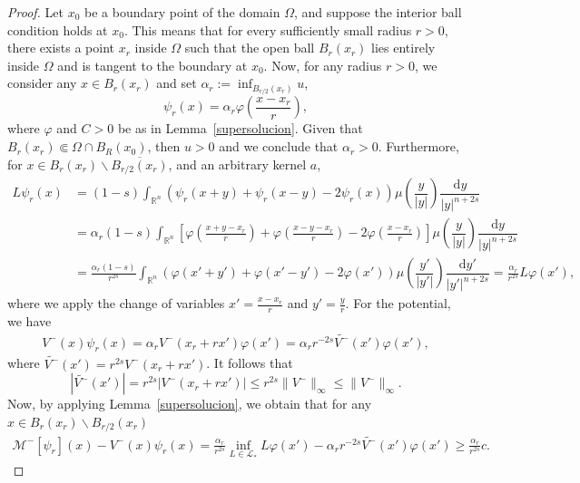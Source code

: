 \documentclass[11pt]{article}
\begin{document}
\begin{proof}
Let \(x_0\) be a boundary point of the domain \(\Omega\), and suppose the interior ball condition holds at \(x_0\). This means that for every sufficiently small radius \(r>0\), there exists a point \(x_r\) inside \(\Omega\) such that the open ball \(B_{r}(x_r)\) lies entirely inside \(\Omega\) and is tangent to the boundary at \(x_0\). Now, for any radius \(r>0\), we consider any \(x\in B_{r}(x_r)\) and set \(\alpha_r:=\inf_{B_{r/2}(x_r)}u\), 
\begin{equation*}
    \psi_{r}(x)=\alpha_{r}\varphi\left(\frac{x-x_{r}}{r}\right),
\end{equation*}
where \(\varphi\) and \(C>0\) be as in Lemma~\ref{supersolucion}. Given that \(B_{r}(x_r)\Subset\Omega \cap B_{R}(x_0)\), then \(u > 0\) and we conclude that \(\alpha_{r}>0\). Furthermore, for \(x\in B_{r}(x_r)\backslash \overline{B_{r/2}(x_r)}\), and an arbitrary kernel \(a\),
\begin{align*}
    L\psi_r(x) &= (1-s)\int_{\mathbb{R}^{n}}
    ({\psi_{r}(x+y) + \psi_{r}(x-y)}-2\psi_{r}(x))\mu \left(\dfrac{y}{|y|}\right)\dfrac{\mathrm{d}y}{|y|^{n+2s}} \\
    &=\alpha_{r}(1-s)\int_{\mathbb{R}^{n}}
    \left[ {\varphi(\frac{x+y-x_{r}}{r}) + \varphi(\frac{x-y-x_{r}}{r})}-2\varphi\left(\frac{x-x_r}{r}\right) \right]
    \mu\left(\dfrac{y}{|y|}\right)\dfrac{\mathrm{d}y}{|y|^{n+2s}} \\ 
    &= \frac{\alpha_{r}(1-s)}{r^{2s}}\int_{\mathbb{R}^{n}}
    \left( \varphi(x'+y') + \varphi(x'-y')-2\varphi\left(x'\right)\right)
    \mu \left(\dfrac{y'}{|y'|}\right)\dfrac{\mathrm{d}y'}{|y'|^{n+2s}} 
    = \frac{\alpha_{r}}{r^{2s}} L\varphi(x'),
\end{align*}
where we apply the change of variables \(x'=\frac{x-x_r}{r}\) and \(y'=\frac{y}{r}\). For the potential, we have
\begin{align*}
    V^{-}(x)\psi_{r}(x) = \alpha_{r}V^{-}(x_r+rx')\varphi(x')=\alpha_{r}r^{-2s}\widetilde{V^{-}}(x')\varphi(x'),
\end{align*}
where \(\widetilde{V^{-}}(x')=r^{2s}V^{-}(x_{r}+rx')\). It follows that \[|\widetilde{V^{-}}(x')|=r^{2s}\left|V^{-}(x_{r}+rx')\right|\leq r^{2s}\|V^{-}\|_{\infty}\leq\|V^{-}\|_{\infty}.\] Now, by applying Lemma~\ref{supersolucion}, we obtain that for any \(x\in B_{r}(x_r)\backslash B_{r/2}(x_r)\)
\begin{align*}
    \mathcal{M}^{-}[\psi_r](x) - V^{-}(x)\psi_{r}(x) = \frac{\alpha_{r}}{r^{2s}}\inf_{L\in\mathcal{L}_{*}}L\varphi(x') - \alpha_{r}r^{-2s}\widetilde{V^{-}}(x')\varphi(x') 
    \geq \frac{\alpha_{r}}{r^{2s}}c. 

\end{align*}
\end{proof}
\end{document}
